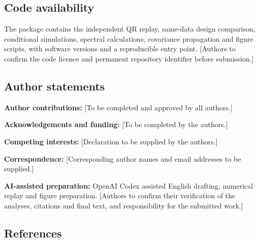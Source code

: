 \documentclass[
  10pt,
  a4paper,
]{article}
\begin{document}
\singlespacing

\hypertarget{code-availability}{%
\subsection{Code availability}\label{code-availability}}

The package contains the independent QR replay, same-data design
comparison, conditional simulations, spectral calculations, covariance
propagation and figure scripts, with software versions and a
reproducible entry point. {[}Authors to confirm the code licence and
permanent repository identifier before submission.{]}

\singlespacing

\hypertarget{author-statements}{%
\subsection{Author statements}\label{author-statements}}

\textbf{Author contributions:} {[}To be completed and approved by all
authors.{]}

\textbf{Acknowledgements and funding:} {[}To be completed by the
authors.{]}

\textbf{Competing interests:} {[}Declaration to be supplied by the
authors.{]}

\textbf{Correspondence:} {[}Corresponding author names and email
addresses to be supplied.{]}

\textbf{AI-assisted preparation:} OpenAI Codex assisted English
drafting, numerical replay and figure preparation. {[}Authors to confirm
their verification of the analyses, citations and final text, and
responsibility for the submitted work.{]}

\clearpage

\singlespacing

\hypertarget{references}{%
\subsection{References}\label{references}}
\end{document}
